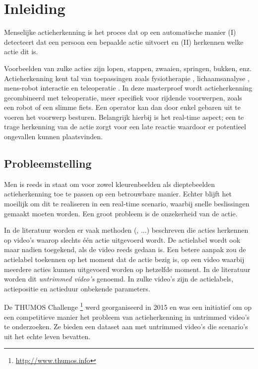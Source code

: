\setcounter{page}{1}
\chapter{Inleiding}
\label{ch:Inleiding}
Menselijke actieherkenning is het proces dat op een automatische manier (I) detecteert dat een persoon een bepaalde actie uitvoert en (II) herkennen welke actie dit is. 

Voorbeelden van zulke acties zijn lopen, stappen, zwaaien, springen, bukken, enz. Actieherkenning kent tal van toepassingen zoals fysiotherapie \cite{Deboeverie2016}, lichaamsanalyse \cite{Devi2015}, mens-robot interactie \cite{Li2018} en teleoperatie \cite{Ajili2017}. In deze masterproef wordt actieherkenning gecombineerd met teleoperatie, meer specifiek voor rijdende voorwerpen, zoals een robot of een slimme fiets. Een operator kan dan door enkel gebaren uit te voeren het voorwerp besturen. Belangrijk hierbij is het real-time aspect; een te trage herkenning van de actie zorgt voor een late reactie waardoor er potentieel ongevallen kunnen plaatsvinden. 

\section{Probleemstelling}
Men is reeds in staat om voor zowel kleurenbeelden als dieptebeelden actieherkenning toe te passen op een betrouwbare manier. Echter blijft het moeilijk om dit te realiseren in een real-time scenario, waarbij snelle beslissingen gemaakt moeten worden. Een groot probleem is de onzekerheid van de actie. 

In de literatuur worden er vaak methoden (\cite{Xia2012}, ...) beschreven die acties herkennen op video's waarop slechts één actie uitgevoerd wordt. De actielabel wordt ook maar nadien toegekend, als de video reeds gedaan is. Een betere aanpak zou de actielabel toekennen op het moment dat de actie bezig is, op een video waarbij meerdere acties kunnen uitgevoerd worden op hetzelfde moment. In de literatuur worden dit \textit{untrimmed video's} genoemd. In zulke video's zijn de actielabels, actiepositie en actieduur onbekende parameters.

De THUMOS Challenge \footnote{\url{http://www.thumos.info}} werd georganiseerd in 2015 en was een initiatief om op een competitieve manier het probleem van actieherkenning in untrimmed video's te onderzoeken. Ze bieden een dataset aan met untrimmed video's die scenario's uit het echte leven bevatten.

